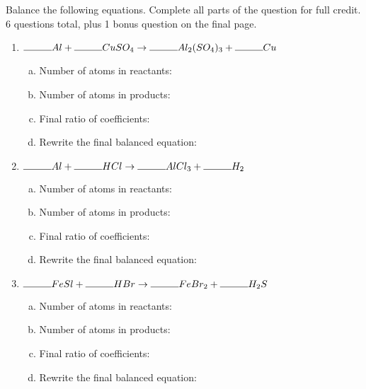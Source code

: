 \documentclass[notitlepage,12pt]{article} %
\begin{document}
\noindent

Balance the following equations. Complete all parts of the question for full credit. \\
6 questions total, plus 1 bonus question on the final page.
\begin{enumerate}

\item $\rule{1cm}{0.4pt} Al + \rule{1cm}{0.4pt}  CuSO_4 \rightarrow \rule{1cm}{0.4pt} Al_2(SO_4)_3 +  \rule{1cm}{0.4pt} Cu$
\begin{enumerate}[a.]
\item Number of atoms in reactants:
\vspace{2cm}
\item Number of atoms in products:
\vspace{2cm}
\item Final ratio of coefficients:
\vspace{2cm}
\item Rewrite the final balanced equation:
\vspace{2cm}
\end{enumerate}


\item $\rule{1cm}{0.4pt} Al + \rule{1cm}{0.4pt}  HCl \rightarrow \rule{1cm}{0.4pt} AlCl_3 +  \rule{1cm}{0.4pt} H_2$
\begin{enumerate}[a.]
\item Number of atoms in reactants:
\vspace{2cm}
\item Number of atoms in products:
\vspace{2cm}
\item Final ratio of coefficients:
\vspace{2cm}
\item Rewrite the final balanced equation:
\vspace{2cm}
\end{enumerate}

\item $\rule{1cm}{0.4pt} FeSl + \rule{1cm}{0.4pt} HBr \rightarrow \rule{1cm}{0.4pt} FeBr_2 +  \rule{1cm}{0.4pt} H_2S$
\begin{enumerate}[a.]
\item Number of atoms in reactants:
\vspace{2cm}
\item Number of atoms in products:
\vspace{2cm}
\item Final ratio of coefficients:
\vspace{2cm}
\item Rewrite the final balanced equation:
\vspace{2cm}
\end{enumerate}


\end{enumerate}
\end{document}

